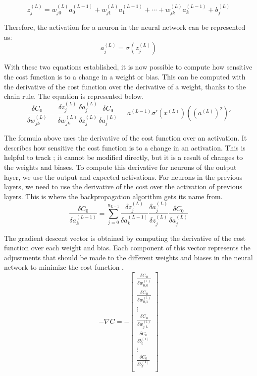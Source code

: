 ﻿\documentclass[12pt,a4paper,notitlepage]{article}
\begin{document}
\begin{displaymath}
 z_j^{(L)} = w_{j0}^{(L)}a_0^{(L-1)} + w_{j1}^{(L)}a_1^{(L-1)} + \cdots + w_{jk}^{(L)}a_k^{(L-1)} + b_j^{(L)}
\end{displaymath}

Therefore, the activation for a neuron in the neural network can be represented as:
\begin{displaymath}
 a_j^{(L)} = \sigma\left(z_j^{(L)}\right)
\end{displaymath}

With these two equations established, it is now possible to compute how sensitive the cost function is to a change in a weight or bias. This can be computed with the derivative of the cost function over the derivative of a weight, thanks to the chain rule. The equation is represented below.
\begin{displaymath}
 \frac{\delta C_0}{\delta w_{jk}^{(L)}} =
 \frac{\delta z_j^{(L)}}{\delta w_{jk}^{(L)}}
 \frac{\delta a_j^{(L)}}{\delta z_j^{(L)}}
 \frac{\delta C_0}{\delta a_j^{(L)}}
 = a^{(L-1)} \sigma\prime(x^{(L)})((a^{(L)})^2)\prime
\end{displaymath}

The formula above uses the derivative of the cost function over an activation. It describes how sensitive the cost function is to a change in an activation. This is helpful to track ; it cannot be modified directly, but it is a result of changes to the weights and biases. To compute this derivative for neurons of the output layer, we use the output and expected activations. For neurons in the previous layers, we need to use the derivative of the cost over the activation of previous layers. This is where the backpropagation algorithm gets its name from.
\begin{displaymath}
 \frac{\delta C_0}{\delta a_{k}^{(L-1)}} = 
 \sum_{j=0}^{n_{L-1}}
 \frac{\delta z_j^{(L)}}{\delta a_{k}^{(L-1)}}
 \frac{\delta a_j^{(L)}}{\delta z_j^{(L)}}
 \frac{\delta C_0}{\delta a_j^{(L)}}
\end{displaymath}

The gradient descent vector is obtained by computing the derivative of the cost function over each weight and bias. Each component of this vector represents the adjustments that should be made to the different weights and biases in the neural network to minimize the cost function \cite{sanderson_backpropagation_2017}.
\begin{displaymath}
 -\nabla C =
 -\begin{bmatrix}
  \frac{\delta C_0}{\delta w_{0,0}^{(1)}}\\
  \frac{\delta C_0}{\delta w_{0,1}^{(1)}}\\
  \vdots\\
  \frac{\delta C_0}{\delta w_{j,k}^{(1)}}\\
  \frac{\delta C_0}{\delta b_{0}^{(1)}}\\
  \vdots\\
  \frac{\delta C_0}{\delta b_{k}^{(1)}}\\
 \end{bmatrix}
\end{displaymath}
\end{document}
